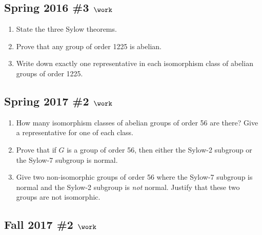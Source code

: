 \hypertarget{spring-2016-3-work}{%
\subsection{\texorpdfstring{Spring 2016 \#3
\(\work\)}{Spring 2016 \#3 \textbackslash work}}\label{spring-2016-3-work}}

\begin{enumerate}
\def\labelenumi{\alph{enumi}.}
\item
  State the three Sylow theorems.
\item
  Prove that any group of order 1225 is abelian.
\item
  Write down exactly one representative in each isomorphism class of
  abelian groups of order 1225.
\end{enumerate}

\hypertarget{spring-2017-2-work}{%
\subsection{\texorpdfstring{Spring 2017 \#2
\(\work\)}{Spring 2017 \#2 \textbackslash work}}\label{spring-2017-2-work}}

\begin{enumerate}
\def\labelenumi{\alph{enumi}.}
\item
  How many isomorphism classes of abelian groups of order 56 are there?
  Give a representative for one of each class.
\item
  Prove that if \(G\) is a group of order 56, then either the Sylow-2
  subgroup or the Sylow-7 subgroup is normal.
\item
  Give two non-isomorphic groups of order 56 where the Sylow-7 subgroup
  is normal and the Sylow-2 subgroup is \emph{not} normal. Justify that
  these two groups are not isomorphic.
\end{enumerate}

\hypertarget{fall-2017-2-work}{%
\subsection{\texorpdfstring{Fall 2017 \#2
\(\work\)}{Fall 2017 \#2 \textbackslash work}}\label{fall-2017-2-work}}

